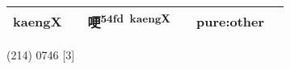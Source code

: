 \documentclass[14pt,a4paper]{scrartcl}
\begin{document}
\begin{longtable}[c]{@{}llllll@{}}
\begin{minipage}[t]{0.14\columnwidth}\raggedright\strut
kaengX
\strut\end{minipage} &
\begin{minipage}[t]{0.14\columnwidth}\raggedright\strut
\strut\end{minipage} &
\begin{minipage}[t]{0.14\columnwidth}\raggedright\strut
哽\textsuperscript{54fd~kaengX}
\strut\end{minipage} &
\begin{minipage}[t]{0.14\columnwidth}\raggedright\strut
\strut\end{minipage} &
\begin{minipage}[t]{0.14\columnwidth}\raggedright\strut
pure:other
\strut\end{minipage}\tabularnewline
\bottomrule
\end{longtable}

(214) 0746 {[}3{]}
\end{document}
